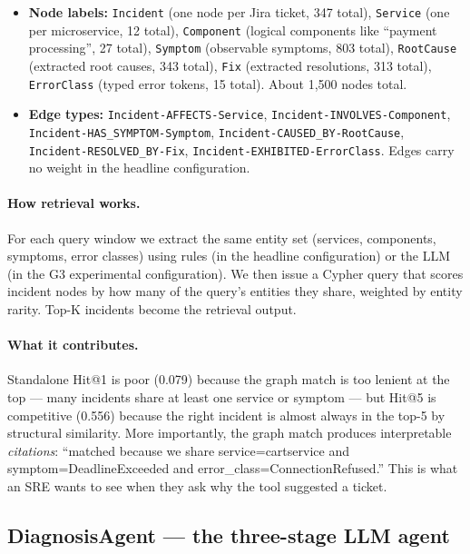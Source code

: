 \begin{itemize}
\item \textbf{Node labels:} \texttt{Incident} (one node per Jira ticket, 347 total), \texttt{Service} (one per microservice, 12 total), \texttt{Component} (logical components like ``payment processing'', 27 total), \texttt{Symptom} (observable symptoms, 803 total), \texttt{RootCause} (extracted root causes, 343 total), \texttt{Fix} (extracted resolutions, 313 total), \texttt{ErrorClass} (typed error tokens, 15 total). About 1{,}500 nodes total.
\item \textbf{Edge types:} \texttt{Incident-AFFECTS-Service}, \texttt{Incident-INVOLVES-Component}, \texttt{Incident-HAS\_SYMPTOM-Symptom}, \texttt{Incident-CAUSED\_BY-RootCause}, \texttt{Incident-RESOLVED\_BY-Fix}, \texttt{Incident-EXHIBITED-ErrorClass}. Edges carry no weight in the headline configuration.
\end{itemize}

\paragraph{How retrieval works.} For each query window we extract the same entity set (services, components, symptoms, error classes) using rules (in the headline configuration) or the LLM (in the G3 experimental configuration). We then issue a Cypher query that scores incident nodes by how many of the query's entities they share, weighted by entity rarity. Top-K incidents become the retrieval output.

\paragraph{What it contributes.} Standalone Hit@1 is poor (0.079) because the graph match is too lenient at the top --- many incidents share at least one service or symptom --- but Hit@5 is competitive (0.556) because the right incident is almost always in the top-5 by structural similarity. More importantly, the graph match produces interpretable \emph{citations}: ``matched because we share service=cartservice and symptom=DeadlineExceeded and error\_class=ConnectionRefused.'' This is what an SRE wants to see when they ask why the tool suggested a ticket.

\subsection{DiagnosisAgent --- the three-stage LLM agent}

